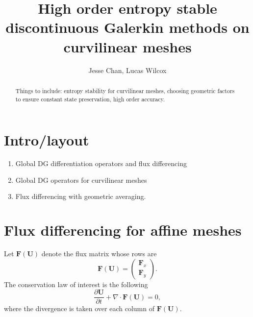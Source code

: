 \documentclass[preprint,10pt]{article}
\date{}
\author{Jesse Chan, Lucas Wilcox}
\title{High order entropy stable discontinuous Galerkin methods on curvilinear meshes}
\theoremstyle{definition}
\theoremstyle{lemma}
\theoremstyle{theorem}
\theoremstyle{assumption}
\newcommand{\pd}[2]{\frac{\partial#1}{\partial#2}}
\newcommand{\LRp}[1]{\left( #1 \right)}
\newcommand{\Grad} {\ensuremath{\nabla}}
\begin{document}
\maketitle


\begin{abstract}
Things to include: entropy stability for curvilinear meshes, choosing geometric factors to ensure constant state preservation, high order accuracy.  
\end{abstract}

\section{Intro/layout}

\begin{enumerate}
\item Global DG differentiation operators and flux differencing 
\item Global DG operators for curvilinear meshes
\item Flux differencing with geometric averaging.  
\end{enumerate}



\section{Flux differencing for affine meshes}

Let $\bm{F}(\bm{U})$ denote the flux matrix whose rows are 
\[
\bm{F}(\bm{U}) = \LRp{
\begin{array}{c}
\bm{F}_x \\
\bm{F}_y
\end{array}
}.
\]
The conservation law of interest is the following
\[
\pd{\bm{U}}{t} + \Grad \cdot \bm{F}(\bm{U}) = 0,
\]
where the divergence is taken over each column of $\bm{F}(\bm{U})$.  
\end{document}
